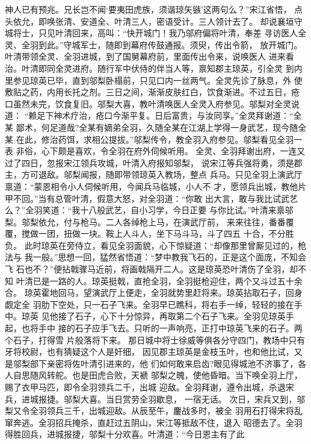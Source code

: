 神人已有预兆。兄长岂不闻‘要夷田虎族，须谐琼矢镞’这两句么？”宋江省悟，
点头依允，即唤张清、安道全、叶清三人，密语受计。三人领计去了。
却说襄垣守城将士，只见叶清回来，高叫：“快开城门！我乃邬府偏将叶清，奉差
寻访医人全灵、全羽到此。”守城军士，随即到幕府传鼓通报。须臾，传出令箭，
放开城门。叶清带领全灵、全羽进城，到了国舅幕府前，里面传出令来，说唤医人
进来看治。叶清即同全灵进府。随行军中伏侍的伴当人等，禀知郡主琼英，引全灵
到内里参见琼英已毕，直到邬梨卧榻前，只见口内一丝两气。全灵先诊了脉息，外
使敷贴之药，内用长托之剂。三日之间，渐渐皮肤红白，饮食渐进。不过五日，疮
口虽然未完，饮食复旧。邬梨大喜，教叶清唤医人全灵入府参见。邬梨对全灵说道：
“赖足下神术疗治，疮口今渐平复。日后富贵，与汝同享。”全灵拜谢道：“全某
鄙术，何足道哉?全某有嫡弟全羽，久随全某在江湖上学得一身武艺，现今随全某
在此，修治药饵，求相公提拔。”邬梨传令，教全羽入府参见。邬梨看见全羽一表
非俗，心下颇是喜欢，令全羽在府外伺候听用。
全灵、全羽拜谢出府，一连又过了四日，忽报宋江领兵攻城，叶清入府报知邬梨，
说宋江等兵强将勇，须是郡主，方可退敌。邬梨闻报，随即带领琼英入教场，整点
兵马。只见全羽上演武厅禀道：“蒙恩相令小人伺候听用，今闻兵马临城，小人不
才，愿领兵出城，教他片甲不回。”当有总管叶清，假意大怒，对全羽道：“你敢
出大言，敢与我比试武艺么？”全羽笑道：“我十八般武艺，自小习学，今日正要
与你比试。”叶清来禀邬梨。邬梨依允，付与枪马。二人各绰枪上马，在演武厅前，
来来往往，番番覆覆，搅做一团，扭做一块。鞍上人斗人，坐下马斗马，斗了四五
十合，不分胜负。
此时琼英在旁侍立，看见全羽面貌，心下惊疑道：“却像那里曾厮见过的，枪法与
我一般。”思想一回，猛然省悟道：“梦中教我飞石的，正是这个面庞，不知会飞
石也不？”便拈戟骤马近前，将画戟隔开二人。这是琼英恐叶清伤了全羽，却不知
叶清已是一路的人。琼英挺戟，直抢全羽，全羽挺枪迎住，两个又斗过五十余合。
琼英霍地回马，望演武厅上便走，全羽就势里赶将来。琼英拈取石子，回身觑定全
羽肋下空处，只一石子飞来。全羽早已瞧科，将右手一绰，轻轻的接在手中。琼英
见他接了石子，心下十分惊异，再取第二个石子飞来。全羽见琼英手起，也将手中
接的石子应手飞去。只听的一声响亮，正打中琼英飞来的石子。两个石子，打得雪
片般落将下来。
那日城中将士徐威等俱各分守四门，教场中只有牙将校尉，也有猜疑这个人是奸细，
因见郡主琼英是金枝玉叶，也和他比试，又是邬梨部下亲密将佐叶清引进来的，他
们如何敢来启齿?眼见得城池不济事了，各人自思随风转舵。也是田虎合败，天褫
邬梨之魄，使他昏暗。当下唤全羽上厅，赐了衣甲马匹，即令全羽领兵二千，出城
迎敌。全羽拜谢，遵令出城，杀退宋兵，进城报捷。邬梨大喜。当日赏劳全羽歇息，
一宿无话。
次日，宋兵又到，邬梨又令全羽领兵三千，出城迎敌。从辰至午，鏖战多时，被全
羽用石打得宋将乱窜奔逃。全羽招兵掩杀，直赶过五阴山，宋江等抵敌不住，退入
昭德去了。全羽得胜回兵，进城报捷，邬梨十分欢喜。叶清道：“今日恩主有了此
